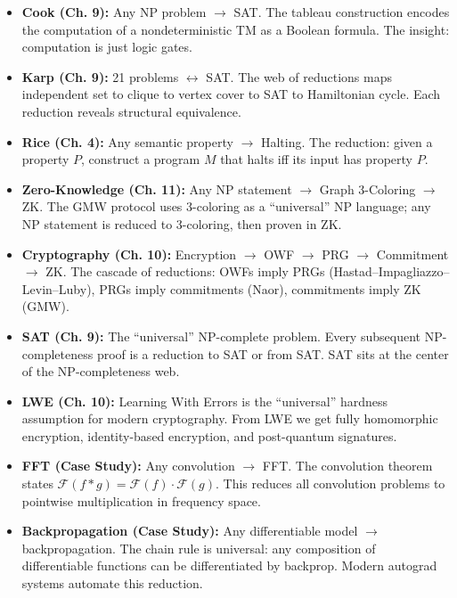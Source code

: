 \begin{itemize}
\item \textbf{Cook (Ch. 9):} Any NP problem $\to$ SAT. The tableau construction encodes the computation of a nondeterministic TM as a Boolean formula. The insight: computation is just logic gates.

\item \textbf{Karp (Ch. 9):} 21 problems $\leftrightarrow$ SAT. The web of reductions maps independent set to clique to vertex cover to SAT to Hamiltonian cycle. Each reduction reveals structural equivalence.

\item \textbf{Rice (Ch. 4):} Any semantic property $\to$ Halting. The reduction: given a property $P$, construct a program $M$ that halts iff its input has property $P$.

\item \textbf{Zero-Knowledge (Ch. 11):} Any NP statement $\to$ Graph 3-Coloring $\to$ ZK. The GMW protocol uses 3-coloring as a ``universal'' NP language; any NP statement is reduced to 3-coloring, then proven in ZK.

\item \textbf{Cryptography (Ch. 10):} Encryption $\to$ OWF $\to$ PRG $\to$ Commitment $\to$ ZK. The cascade of reductions: OWFs imply PRGs (Hastad--Impagliazzo--Levin--Luby), PRGs imply commitments (Naor), commitments imply ZK (GMW).

\item \textbf{SAT (Ch. 9):} The ``universal'' NP-complete problem. Every subsequent NP-completeness proof is a reduction to SAT or from SAT. SAT sits at the center of the NP-completeness web.

\item \textbf{LWE (Ch. 10):} Learning With Errors is the ``universal'' hardness assumption for modern cryptography. From LWE we get fully homomorphic encryption, identity-based encryption, and post-quantum signatures.

\item \textbf{FFT (Case Study):} Any convolution $\to$ FFT. The convolution theorem states $\mathcal{F}(f * g) = \mathcal{F}(f) \cdot \mathcal{F}(g)$. This reduces all convolution problems to pointwise multiplication in frequency space.

\item \textbf{Backpropagation (Case Study):} Any differentiable model $\to$ backpropagation. The chain rule is universal: any composition of differentiable functions can be differentiated by backprop. Modern autograd systems automate this reduction.


\end{itemize}
